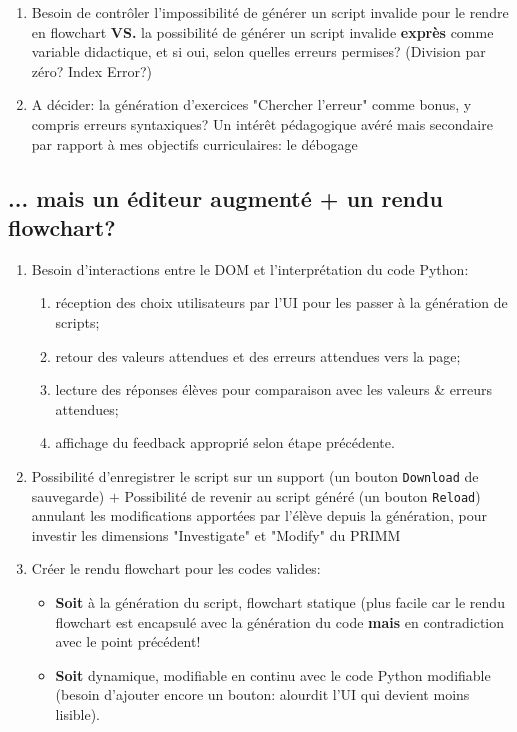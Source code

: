 \documentclass[11pt,a4paper]{article}
\begin{document}
\begin{enumerate}
    \item Besoin de contrôler l'impossibilité de générer un script invalide pour le rendre en flowchart \textbf{VS.} la possibilité de générer un script invalide \textbf{exprès} comme variable didactique, et si oui, selon quelles erreurs permises? (Division par zéro? Index Error?) 
    
    \item A décider: la génération d'exercices "Chercher l'erreur" comme bonus, y compris erreurs syntaxiques? Un intérêt pédagogique avéré mais secondaire par rapport à mes objectifs curriculaires: le débogage
    
\end{enumerate}
        
\subsection{... mais un éditeur augmenté + un rendu flowchart?}
\begin{enumerate}
    
    \item Besoin d'interactions entre le DOM et l'interprétation du code Python: 
    \begin{enumerate}
        \item réception des choix utilisateurs par l'UI pour les passer à la génération de scripts; 
        \item retour des valeurs attendues et des erreurs attendues vers la page; 
        \item lecture des réponses élèves pour comparaison avec les valeurs \& erreurs attendues; 
        \item affichage du feedback approprié selon étape précédente.
    \end{enumerate}
    
    \item Possibilité d'enregistrer le script sur un support (un bouton \texttt{Download} de sauvegarde) $+$ Possibilité de revenir au script généré (un bouton \texttt{Reload}) annulant les modifications apportées par l'élève depuis la génération, pour investir les dimensions "Investigate" et "Modify" du PRIMM

    \item Créer le rendu flowchart pour les codes valides:
    \begin{itemize}
        \item \textbf{Soit} à la génération du script, flowchart statique (plus facile car le rendu flowchart est encapsulé avec la génération du code \textbf{mais} en contradiction avec le point précédent!
        \item \textbf{Soit} dynamique, modifiable en continu avec le code Python modifiable (besoin d'ajouter encore un bouton: alourdit l'UI qui devient moins lisible).
    \end{itemize}
    
\end{enumerate}
\end{document}
